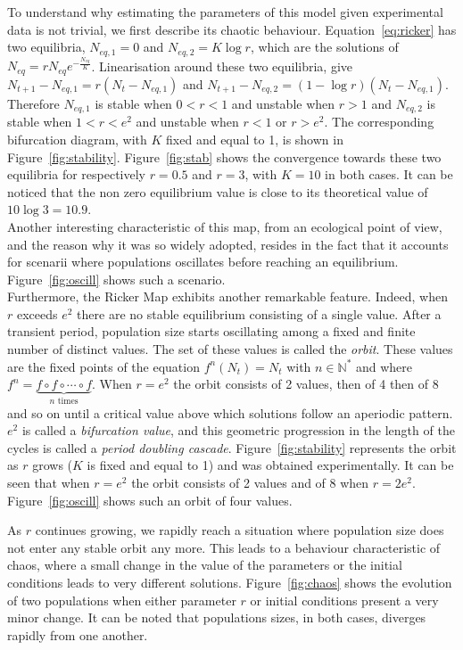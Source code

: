 \documentclass{article}
\begin{document}
	To understand why estimating the parameters of this model given experimental data is not trivial, we first describe its chaotic behaviour. Equation~\ref{eq:ricker} has two equilibria, $N_{eq, 1} = 0$ and $N_{eq, 2} = K\log r$, which are the solutions of  $N_{eq} = r N_{eq} e^{-\frac{N_{eq}}{K}}$. Linearisation around these two equilibria, give $N_{t+1} - N_{eq, 1} = r(N_{t} - N_{eq, 1})$ and $N_{t+1} - N_{eq, 2} = (1-\log r)(N_{t} - N_{eq, 1})$. Therefore $N_{eq, 1}$ is stable when $0 < r < 1$ and unstable when $r > 1$ and $N_{eq, 2}$ is stable when $1 < r < e^2$ and unstable when $r < 1$ or $r > e^2$. The corresponding bifurcation diagram, with $K$ fixed and equal to 1, is shown in Figure~\ref{fig:stability}. Figure~\ref{fig:stab} shows the convergence towards these two equilibria for respectively $r=0.5$ and $r=3$, with $K=10$ in both cases. It can be noticed that the non zero equilibrium value is close to its theoretical value of $10 \log 3 = 10.9$. \\
	Another interesting characteristic of this map, from an ecological point of view, and the reason why it was so widely adopted, resides in the fact that it accounts for scenarii where populations oscillates before reaching an equilibrium. Figure~\ref{fig:oscill} shows such a scenario.\\
	
	Furthermore, the Ricker Map exhibits another remarkable feature. Indeed, when $r$ exceeds $e^2$ there are no stable equilibrium consisting of a single value. After a transient period, population size starts oscillating among a fixed and finite number of distinct values. The set of these values is called the \emph{orbit}. These values are the fixed points of the equation $f^n(N_t) = N_t$ with $n \in \mathbb{N^*}$ and where $f^n = \underbrace{f\circ f\circ \cdots \circ f}_{n\text{\ times}}$. When $r=e^2$ the orbit consists of 2 values, then of 4 then of 8 and so on until a critical value above which solutions follow an aperiodic pattern. $e^2$ is called a \emph{bifurcation value}, and this geometric progression in the length of the cycles is called a \emph{period doubling cascade}. Figure~\ref{fig:stability} represents the orbit as $r$ grows ($K$ is fixed and equal to 1) and was obtained experimentally. It can be seen that when $r=e^2$ the orbit consists of 2 values and of 8 when $r=2e^2$. Figure~\ref{fig:oscill} shows such an orbit of four values.
	
	As $r$ continues growing, we rapidly reach a situation where population size does not enter any stable orbit any more. This leads to a behaviour characteristic of chaos, where a small change in the value of the parameters or the initial conditions leads to very different solutions. Figure~\ref{fig:chaos} shows the evolution of two populations when either parameter $r$ or initial conditions present a very minor change. It can be noted that populations sizes, in both cases, diverges rapidly from one another.
	
\end{document}
